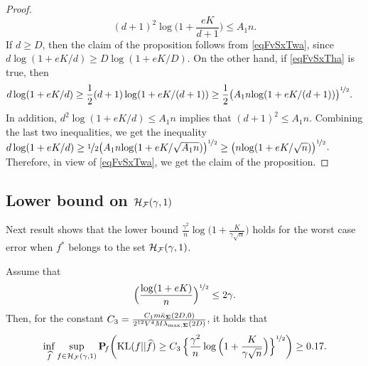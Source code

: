 \begin{proof}
	\begin{equation}\label{eqFvSxTha}
	(d+1)^2\log\Big(1+\frac{e  K}{d+1}\Big)\le A_1 n.
	\end{equation}
	If $d\ge D$, then the claim of the proposition follows from \eqref{eqFvSxTwa}, since
	$d\log(1+eK/d)\ge D\log(1+eK/D)$. On the other hand, if \eqref{eqFvSxTha} is true, then
	\begin{align}
	d\log(1+eK/d) 
	&\ge \frac12 (d+1)\log(1+eK/(d+1)) 
	\ge \frac12 \big({A_1 n}{\log(1+eK/(d+1))}\big)^{\nicefrac12}.
	\end{align}
	In addition, $d^2\log(1+eK/d)\le A_1 n$ implies that $(d+1)^2 \le A_1 n$. Combining the last
	two inequalities, we get the inequality $d\log(1+eK/d)  \ge \nicefrac12 \big({A_1 n}{\log(1+eK/\sqrt{A_1n})}\big)^{\nicefrac12}\ge  \big({n}{\log(1+eK/\sqrt{n})}\big)^{\nicefrac12}$. 
	Therefore, in view of \eqref{eqFvSxTwa}, we get the claim of the proposition.
\end{proof}


\subsection{Lower bound on $\mathcal H_\mathcal F(\gamma,1)$} %

Next result shows that the lower bound ${\frac{\gamma^2}n\log\big(1+\frac{K}{\gamma\sqrt{n}}\big)}$ 
holds for the worst case error when $f^*$ belongs to the set $\mathcal H_\mathcal F(\gamma,1)$. 
\begin{proposition}\label{prop:lower:2}
	Assume that
	\begin{equation}
	\Big(\frac{\log(1+eK)}{n}\Big)^{\nicefrac12}\le 2\gamma.
	\end{equation}
	Then, for the constant $C_3 =
	\frac{C_1 m \bar\kappa_{\boldsymbol\Sigma}(2D,0) }{2^{12}V^4 M\lambda_{\max,\boldsymbol\Sigma}(2D)}$,
	it holds that
	\begin{equation}
	\inf_{\widehat f}\sup_{f \in \mathcal H_\mathcal F(\gamma,1)}\mathbf P\!_{f}\bigg({\rm KL}(f||\widehat f)\geq
	C_3\,\Big\{{\frac{\gamma^2}n\log\Big(1+\frac{K}{\gamma\sqrt{n}}\Big)}\Big\}^{\nicefrac12}\bigg)\geq 0.17.
	\end{equation}
\end{proposition}


